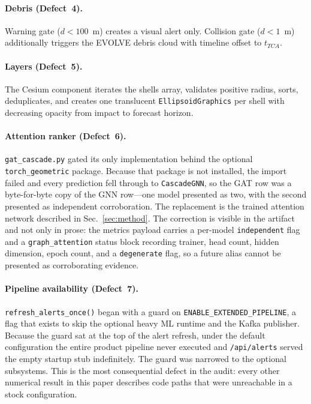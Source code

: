 \documentclass[conference]{IEEEtran}
\begin{document}
\paragraph{Debris (Defect~4).}
Warning gate ($d < 100$~m) creates a visual alert only. Collision gate
($d < 1$~m) additionally triggers the EVOLVE debris cloud with timeline
offset to $t_{TCA}$.

\paragraph{Layers (Defect~5).}
The Cesium component iterates the shells array, validates positive radius,
sorts, deduplicates, and creates one translucent \texttt{EllipsoidGraphics}
per shell with decreasing opacity from impact to forecast horizon.

\paragraph{Attention ranker (Defect~6).}
\texttt{gat\_cascade.py} gated its only implementation behind the optional
\texttt{torch\_geometric} package. Because that package is not installed, the
import failed and every prediction fell through to \texttt{CascadeGNN}, so the
GAT row was a byte-for-byte copy of the GNN row---one model presented as two,
with the second presented as independent corroboration. The replacement is the
trained attention network described in Sec.~\ref{sec:method}. The correction is
visible in the artifact and not only in prose: the metrics payload carries a
per-model \texttt{independent} flag and a \texttt{graph\_attention} status block
recording trainer, head count, hidden dimension, epoch count, and a
\texttt{degenerate} flag, so a future alias cannot be presented as corroborating
evidence.

\paragraph{Pipeline availability (Defect~7).}
\texttt{refresh\_alerts\_once()} began with a guard on
\texttt{ENABLE\_EXTENDED\_PIPELINE}, a flag that exists to skip the optional heavy
ML runtime and the Kafka publisher. Because the guard sat at the top of the
alert refresh, under the default configuration the entire product pipeline never
executed and \texttt{/api/alerts} served the empty startup stub indefinitely. The
guard was narrowed to the optional subsystems. This is the most consequential
defect in the audit: every other numerical result in this paper describes code
paths that were unreachable in a stock configuration.
\end{document}
